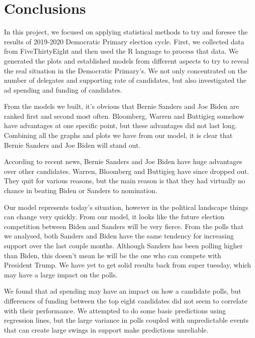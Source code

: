 \section{Conclusions}\label{conclusions}

In this project, we focused on applying statistical methods to try and foresee the results of 2019-2020 Democratic Primary election cycle. First, we collected data from FiveThirtyEight and then used the R language to process that data. We generated the plots and established models from different aspects to try to reveal the real situation in the Democratic Primary's. We not only concentrated on the number of delegates and supporting rate of candidates, but also investigated the ad spending and funding of candidates.

From the models we built, it’s obvious that Bernie Sanders and Joe Biden are ranked first and second most often. Bloomberg, Warren and Buttigieg somehow have advantages at one specific point, but these advantages did not last long. Combining all the graphs and plots we have from our model, it is clear that Bernie Sanders and Joe Biden will stand out.

According to recent news, Bernie Sanders and Joe Biden have huge advantages over other candidates. Warren, Bloomberg and Buttigieg have since dropped out. They quit for various reasons, but the main reason is that they had virtually no chance in beating Biden or Sanders to nomination. 

Our model represents today’s situation, however in the political landscape things can change very quickly. From our model, it looks like the future election competition between Biden and Sanders will be very fierce. From the polls that we analysed, both Sanders and Biden have the same tendency for increasing support over the last couple months. Although Sanders has been polling higher than Biden, this doesn’t mean he will be the one who can compete with President Trump. We have yet to get solid results back from super tuesday, which may have a large impact on the polls.

We found that ad spending may have an impact on how a candidate polls, but differences of funding between the top eight candidates did not seem to correlate with their performance. We attempted to do some basic predictions using regression lines, but the large variance in polls coupled with  unpredictable events that can create large swings in support make predictions unreliable.
